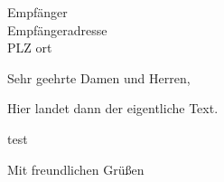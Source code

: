 \documentclass[
	ngerman,%
	]{scrartcl}
\begin{document}
	

	
\begin{letter}{Empfänger\\Empfängeradresse\\PLZ ort}
	

	
\opening{Sehr geehrte Damen und Herren,}%

Hier landet dann der eigentliche Text.

\vfill

test

\closing{Mit freundlichen Grüßen}




	
\end{letter}
\end{document}
